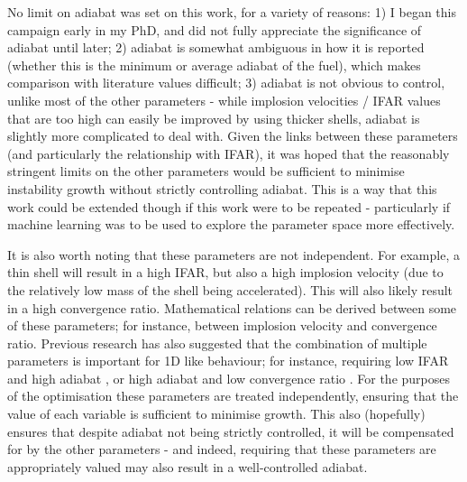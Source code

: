 No limit on adiabat was set on this work, for a variety of reasons: 1) I began this campaign early in my PhD, and did not fully appreciate the significance of adiabat until later; 2) adiabat is somewhat ambiguous in how it is reported (whether this is the minimum or average adiabat of the fuel), which makes comparison with literature values difficult; 3) adiabat is not obvious to control, unlike most of the other parameters - while implosion velocities / IFAR values that are too high can easily be improved by using thicker shells, adiabat is slightly more complicated to deal with. Given the links between these parameters (and particularly the relationship with IFAR), it was hoped that the reasonably stringent limits on the other parameters would be sufficient to minimise instability growth without strictly controlling adiabat. This is a way that this work could be extended though if this work were to be repeated - particularly if machine learning was to be used to explore the parameter space more effectively.

It is also worth noting that these parameters are not independent. For example, a thin shell will result in a high IFAR, but also a high implosion velocity (due to the relatively low mass of the shell being accelerated). This will also likely result in a high convergence ratio. Mathematical relations can be derived between some of these parameters; for instance, between implosion velocity and convergence ratio. Previous research has also suggested that the combination of multiple parameters is important for 1D like behaviour; for instance, requiring low IFAR and high adiabat \cite{Goncharov2014}, or high adiabat and low convergence ratio \cite{Goncharov2003}. For the purposes of the optimisation these parameters are treated independently, ensuring that the value of each variable is sufficient to minimise growth. This also (hopefully) ensures that despite adiabat not being strictly controlled, it will be compensated for by the other parameters - and indeed, requiring that these parameters are appropriately valued may also result in a well-controlled adiabat.

